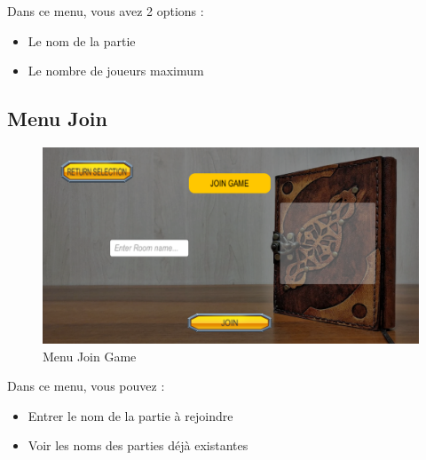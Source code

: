 \documentclass[a4paper, 11pt]{article}
\begin{document}
	\noindent Dans ce menu, vous avez 2 options :
	\begin{itemize}
		\item Le nom de la partie 
		\item Le nombre de joueurs maximum
	\end{itemize}
	
	\subsection{Menu Join}
	\begin{figure}[!ht]
		\centering
		\includegraphics[scale=0.3]{images/join.png}
		\caption{Menu Join Game}
	\end{figure}
	
	\noindent Dans ce menu, vous pouvez :
	\begin{itemize}
		\item Entrer le nom de la partie à rejoindre
		\item Voir les noms des parties déjà existantes
	\end{itemize}
	
	\clearpage
	
\end{document}
